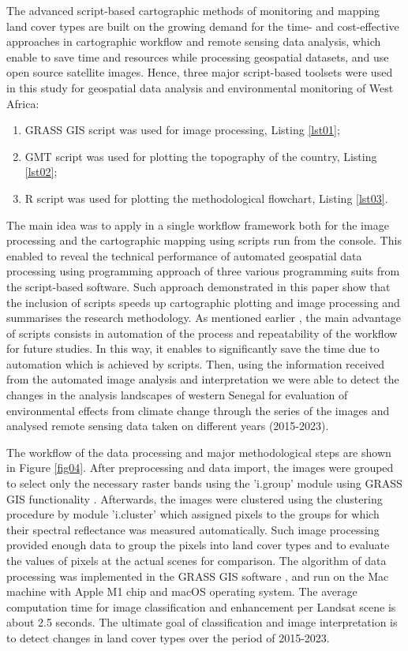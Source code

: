 \documentclass[earth,article,submit,pdftex,moreauthors]{Definitions/mdpi}
\begin{document}
The advanced script-based cartographic methods of monitoring and mapping land cover types are built on the growing demand for the time- and cost-effective approaches in cartographic workflow and remote sensing data analysis, which enable to save time and resources while processing geospatial datasets, and use open source satellite images. Hence, three major script-based toolsets were used in this study for geospatial data analysis and environmental monitoring of West Africa:

 \begin{enumerate}
        \item GRASS GIS script was used for image processing, Listing \ref{lst01}; 
        \item GMT script was used for plotting the topography of the country, Listing \ref{lst02};  
        \item R script was used for plotting the methodological flowchart, Listing \ref{lst03}. 
  \end{enumerate}       

 The main idea was to apply in a single workflow framework both for the image processing and the cartographic mapping using scripts run from the console. This enabled to reveal the technical performance of automated geospatial data processing using programming approach of three various programming suits from the script-based software. Such approach demonstrated in this paper show that the inclusion of scripts speeds up cartographic plotting and image processing and summarises the research methodology. As mentioned earlier \cite{Lemenkova202215}, the main advantage of scripts consists in automation of the process and repeatability of the workflow for future studies. In this way, it enables to significantly save the time due to automation which is achieved by scripts. Then, using the information received from the automated image analysis and interpretation we were able to detect the changes in the analysis landscapes of western Senegal for evaluation of environmental effects from climate change through the series of the images and analysed remote sensing data taken on different years (2015-2023). 

The workflow of the data processing and major methodological steps are shown in Figure \ref{fig04}. After preprocessing and data import, the images were grouped to select only the necessary raster bands using the 'i.group' module using GRASS GIS functionality \cite{NetelerMitasova2008}. Afterwards, the images were clustered using the clustering procedure by module 'i.cluster' which assigned pixels to the groups for which their spectral reflectance was measured automatically. Such image processing provided enough data to group the pixels into land cover types and to evaluate the values of pixels at the actual scenes for comparison. The algorithm of data processing was implemented in the GRASS GIS software \cite{NETELER2012124}, and run on the Mac machine with Apple M1 chip and macOS operating system. The average computation time for image classification and enhancement per Landsat scene is about 2.5 seconds. The ultimate goal of classification and image interpretation is to detect changes in land cover types over the period of 2015-2023. 
\end{document}
